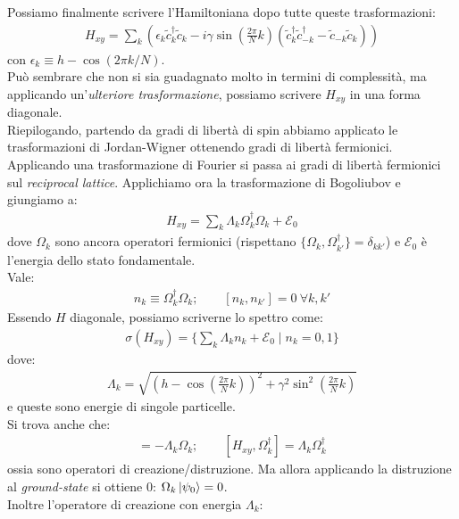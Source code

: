 \documentclass[../../InformazioneQuantistica.tex]{subfiles}
\begin{document}
Possiamo finalmente scrivere l'Hamiltoniana dopo tutte queste trasformazioni:
\begin{align*}
H_{xy}=\sum_{k} \left(\epsilon_k \tilde{c}_k^\dag \tilde{c}_k-i\gamma \sin\left(\frac{2\pi}{N}k\right) \left(\tilde{c}_k^\dag \tilde{c}_{-k}^\dag
 - \tilde{c}_{-k}\tilde{c}_k\right)\right) 
 \end{align*}
 con $\epsilon_k \equiv h-\cos(2\pi k/N)$.\\
 Può sembrare che non si sia guadagnato molto in termini di complessità, ma applicando un'\textit{ulteriore trasformazione}, possiamo scrivere $H_{xy}$ in una forma diagonale.\\
Riepilogando, partendo da gradi di libertà di spin abbiamo applicato le trasformazioni di Jordan-Wigner ottenendo gradi di libertà fermionici. Applicando una trasformazione di Fourier si passa ai gradi di libertà fermionici sul \textit{reciprocal lattice}. Applichiamo ora la trasformazione di Bogoliubov e giungiamo a:
\begin{align*}
H_{xy} = \sum_k \Lambda_k \Omega_k^\dag \Omega_k + \mathcal{E}_0
\end{align*}
dove $\Omega_k$ sono ancora operatori fermionici (rispettano $\{\Omega_k, \Omega_{k'}^\dag\}=\delta_{kk'}$) e $\mathcal{E}_0$ è l'energia dello stato fondamentale.\\
Vale:
\begin{align*}
n_k \equiv \Omega_k^\dag \Omega_k; \qquad [n_k, n_{k'}]=0 \> \forall k,k'
\end{align*}
Essendo $H$ diagonale, possiamo scriverne lo spettro come:
\begin{align*}
\sigma(H_{xy}) = \{\sum_k \Lambda_k n_k + \mathcal{E}_0 \mid n_k=0,1\}
\end{align*}
dove:
\begin{align*}
\Lambda_k = \sqrt{\left( h - \cos\left(\frac{2\pi}{N}k\right)\right)^2+\gamma^2 \sin^2 \left(\frac{2\pi}{N}k\right)}
\end{align*}
e queste sono energie di singole particelle.\\
Si trova anche che:
\begin{align*}
[H_{xy}, \Omega_k] = - \Lambda_k \Omega_k; \qquad [H_{xy},\Omega_k^\dag] = \Lambda_k \Omega_k^\dag
\end{align*}
ossia sono operatori di creazione/distruzione. Ma allora applicando la distruzione al \textit{ground-state} si ottiene $0$: $\Omega_k \Ket{\psi_0} = 0$.\\
Inoltre l'operatore di creazione  con energia $\Lambda_k$:
\end{document}
